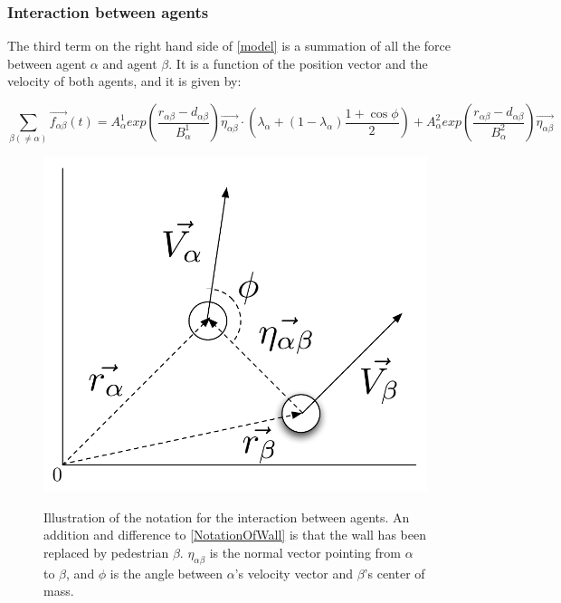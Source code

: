 \subsubsection{Interaction between agents}
The third term on the right hand side of \eqref{model} is a summation of all the 
force between agent $\alpha$ and agent $\beta$. It is a function of the position vector and the velocity of 
both agents, and it is given by:

\begin{equation}
    \sum_{\beta \left( \neq \alpha \right)}
        \vec{f_{\alpha \beta }}\left( t \right) =
        A_{\alpha}^{1} exp \left(
            \frac{ r_{\alpha \beta} - d_{\alpha \beta }}
                 {B_{\alpha}^1}
        \right)
    \vec{\eta_{\alpha \beta}} \cdot
    \left(
        \lambda_{\alpha} + \left(
            1 - \lambda_{\alpha}
        \right)
		\frac{1+\cos{\phi}}{2}
    \right) +
    A_{\alpha}^{2} exp\left(
        \frac{r_{\alpha \beta} - d_{\alpha \beta}}
             {B_{\alpha}^{2}}
    \right)
    \vec{\eta_{\alpha \beta}}
    \label{agentinteraction}
\end{equation}

\begin{figure}[ht]
    \centering
    {\includegraphics[scale=0.35]{Figures/NotationOfInteraction.pdf}} 
    \caption[Notation of the interaction between two agents]{Illustration of the notation for the interaction between agents.
	     An addition and difference to \ref{NotationOfWall} is that the wall has been replaced by pedestrian $\beta$.
	     $\eta_{\alpha \beta}$ is the normal vector pointing from $\alpha$ to $\beta$, and $\phi$ is the angle between $\alpha$'s 
	     velocity vector and $\beta$'s center of mass.}
    \label{NotationOfInteraction}
\end{figure}

